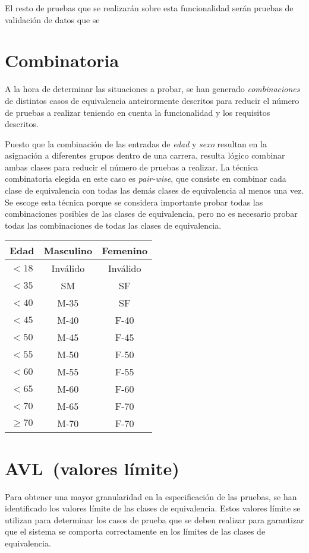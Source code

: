 El resto de pruebas que se realizarán sobre esta funcionalidad serán pruebas de validación
de datos que se

\section{Combinatoria}
A la hora de determinar las situaciones a probar, se han generado \textit{combinaciones} de
distintos casos de equivalencia anteirormente descritos para reducir el número de pruebas a
realizar teniendo en cuenta la funcionalidad y los requisitos descritos.

Puesto que la combinación de las entradas de \textit{edad} y \textit{sexo} resultan en la
asignación a diferentes grupos dentro de una carrera, resulta lógico combinar ambas clases
para reducir el número de pruebas a realizar. La técnica combinatoria elegida en este caso
es \textit{pair-wise}, que consiste en combinar cada clase de equivalencia con todas las demás
clases de equivalencia al menos una vez. Se escoge esta técnica porque se considera importante
probar todas las combinaciones posibles de las clases de equivalencia, pero no es necesario
probar todas las combinaciones de todas las clases de equivalencia.

\begin{table}[ht]
	\centering
	\begin{tabular}{|c|c|c|}
		\hline
		\textbf{Edad} & \textbf{Masculino} & \textbf{Femenino} \\
		\hline
		\hline
		$<18$ & Inválido \cellcolor{red!25} & Inválido \cellcolor{red!25} \\
		$<35$ & SM & SF \\
		$<40$ & M-35 & SF \\
		$<45$ & M-40 & F-40 \\
		$<50$ & M-45 & F-45 \\
		$<55$ & M-50 & F-50 \\
		$<60$ & M-55 & F-55 \\
		$<65$ & M-60 & F-60 \\
		$<70$ & M-65 & F-70 \\
		$\geq 70$ & M-70 & F-70 \\
		\hline
	\end{tabular}
\end{table}

\section{AVL~(valores límite)}
Para obtener una mayor granularidad en la especificación de las pruebas, se han identificado
los valores límite de las clases de equivalencia. Estos valores límite se utilizan para
determinar los casos de prueba que se deben realizar para garantizar que el sistema se
comporta correctamente en los límites de las clases de equivalencia.

